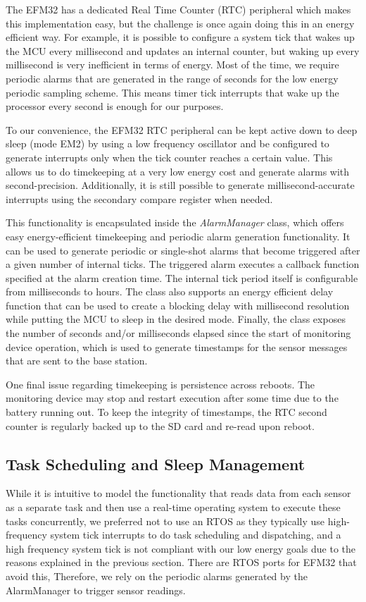 The EFM32 has a dedicated  Real Time Counter (RTC) peripheral which makes this implementation easy, but the challenge is once again doing this in an energy efficient way. For example, it is possible to configure a system tick that wakes up the MCU every millisecond and updates an internal counter, but waking up every millisecond is very inefficient in terms of energy. Most of the time, we require periodic alarms that are generated in the range of seconds for the low energy periodic sampling scheme. This means timer tick interrupts that wake up the processor every second is enough for our purposes.

To our convenience, the EFM32 RTC peripheral can be kept active down to deep sleep (mode EM2) by using a low frequency oscillator and be configured to generate interrupts only when the tick counter reaches a certain value. This allows us to do timekeeping at a very low energy cost and generate alarms with second-precision. Additionally, it is still possible to generate millisecond-accurate interrupts using the secondary compare register when needed.

This functionality is encapsulated inside the \textit{AlarmManager} class, which offers easy energy-efficient timekeeping and periodic alarm generation functionality. It can be used to generate periodic or single-shot alarms that become triggered after a given number of internal ticks. The triggered alarm executes a callback function specified at the alarm creation time. The internal tick period itself is configurable from milliseconds to hours. The class also supports an energy efficient delay function that can be used to create a blocking delay with millisecond resolution while putting the MCU to sleep in the desired mode. Finally, the class exposes the number of seconds and/or milliseconds elapsed since the start of monitoring device operation, which is used to generate timestamps for the sensor messages that are sent to the base station.

One final issue regarding timekeeping is persistence across reboots. The monitoring device may stop and restart execution after some time due to the battery running out. To keep the integrity of timestamps, the RTC second counter is regularly backed up to the SD card and re-read upon reboot.

\subsection{Task Scheduling and Sleep Management}
\label{sec:task_scheduling}
While it is intuitive to model the functionality that reads data from each sensor as a separate task and then use a real-time operating system to execute these tasks concurrently, we preferred not to use an RTOS as they typically use high-frequency system tick interrupts to do task scheduling and dispatching, and a high frequency system tick is not compliant with our low energy goals due to the reasons explained in the previous section. There are RTOS ports for EFM32 that avoid this, Therefore, we rely on the periodic alarms generated by the AlarmManager to trigger sensor readings.

